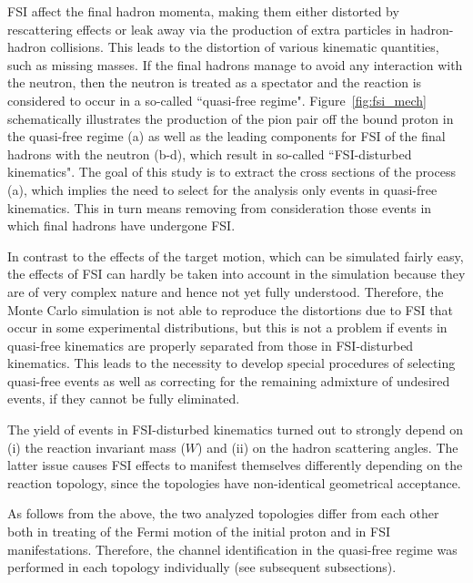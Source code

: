 FSI affect the final hadron momenta, making them either distorted by rescattering effects or leak away via the production of extra particles in hadron-hadron collisions. This leads to the distortion of various kinematic quantities, such as missing masses. If the final hadrons manage to avoid any interaction with the neutron, then the neutron is treated as a spectator and the reaction is considered to occur in a so-called ``quasi-free regime". Figure~\ref{fig:fsi_mech} schematically illustrates the production of the pion pair off the bound proton in the quasi-free regime (a) as well as the leading components for FSI of the final hadrons with the neutron (b-d), which result in so-called ``FSI-disturbed kinematics". The goal of this study is to extract the cross sections of the process (a), which implies the need to select for the analysis only events in quasi-free kinematics. This in turn means removing from consideration those events in which final hadrons have undergone FSI.




In contrast to the effects of the target motion, which can be simulated fairly easy, the effects of FSI can hardly be taken into account in the simulation because they are of very complex nature and hence not yet fully understood. Therefore, the Monte Carlo simulation is not able to reproduce the distortions due to FSI that occur in some experimental distributions, but this is not a problem if events in quasi-free kinematics are properly separated from those in FSI-disturbed kinematics. This leads to the necessity to develop special procedures of selecting quasi-free events as well as correcting for the remaining admixture of undesired events, if they cannot be fully eliminated.

The yield of events in FSI-disturbed kinematics turned out to strongly depend on (i) the reaction invariant mass ($W$) and (ii) on the hadron scattering angles. The latter issue causes FSI effects to manifest themselves differently depending on the reaction topology, since the topologies have non-identical geometrical acceptance.%

As follows from the above, the two analyzed topologies differ from each other both in treating of the Fermi motion of the initial proton and in FSI manifestations. Therefore, the channel identification in the quasi-free regime was performed in each topology individually (see subsequent subsections). 


